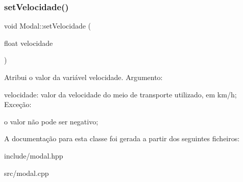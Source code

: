 \subsubsection{\texorpdfstring{set\+Velocidade()}{setVelocidade()}}
{\footnotesize\ttfamily void Modal\+::set\+Velocidade (\begin{DoxyParamCaption}\item[{float}]{velocidade }\end{DoxyParamCaption})}

Atribui o valor da variável velocidade. Argumento\+:
\begin{DoxyItemize}
\item velocidade\+: valor da velocidade do meio de transporte utilizado, em km/h; Exceção\+:
\begin{DoxyItemize}
\item o valor não pode ser negativo;
\end{DoxyItemize}
\end{DoxyItemize}

A documentação para esta classe foi gerada a partir dos seguintes ficheiros\+:\begin{DoxyCompactItemize}
\item 
include/modal.\+hpp\item 
src/modal.\+cpp\end{DoxyCompactItemize}
